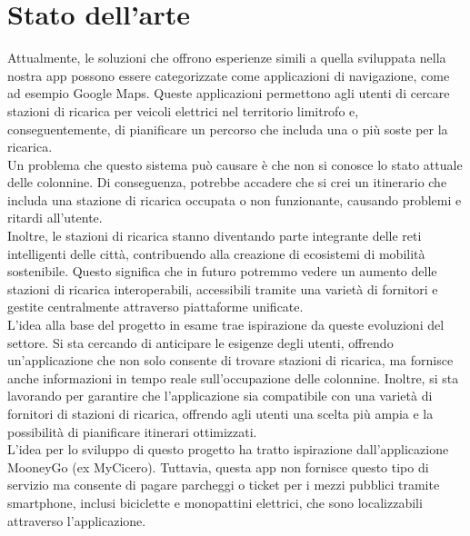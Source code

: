 

\section{Stato dell'arte}

Attualmente, le soluzioni che offrono esperienze simili a quella sviluppata nella nostra app possono essere categorizzate
come applicazioni di navigazione, come ad esempio Google Maps\cite{googlemaps}.
Queste applicazioni permettono agli utenti di cercare stazioni di ricarica per veicoli elettrici nel territorio
limitrofo e, conseguentemente, di pianificare un percorso che includa una o più soste per la ricarica.\\

Un problema che questo sistema può causare è che non si conosce lo stato attuale delle colonnine. Di conseguenza,
potrebbe accadere che si crei un itinerario che includa una stazione di ricarica occupata o non funzionante,
causando problemi e ritardi all'utente.\\

Inoltre, le stazioni di ricarica stanno diventando parte integrante delle reti intelligenti delle città,
contribuendo alla creazione di ecosistemi di mobilità sostenibile. Questo significa che in futuro potremmo
vedere un aumento delle stazioni di ricarica interoperabili, accessibili tramite una varietà di fornitori
e gestite centralmente attraverso piattaforme unificate.\\

L'idea alla base del progetto in esame trae ispirazione da queste evoluzioni del settore. Si sta cercando
di anticipare le esigenze degli utenti, offrendo un'applicazione che non solo consente di trovare stazioni
di ricarica, ma fornisce anche informazioni in tempo reale sull'occupazione delle colonnine. Inoltre, si sta
lavorando per garantire che l'applicazione sia compatibile con una varietà di fornitori di stazioni di ricarica,
offrendo agli utenti una scelta più ampia e la possibilità di pianificare itinerari ottimizzati.\\

L'idea per lo sviluppo di questo progetto ha tratto ispirazione dall'applicazione MooneyGo\cite{mooneygo} (ex MyCicero\cite{mycicero}). Tuttavia,
questa app non fornisce questo tipo di servizio ma consente di pagare parcheggi o ticket per i mezzi pubblici
tramite smartphone, inclusi biciclette e monopattini elettrici, che sono localizzabili attraverso l'applicazione.\\

